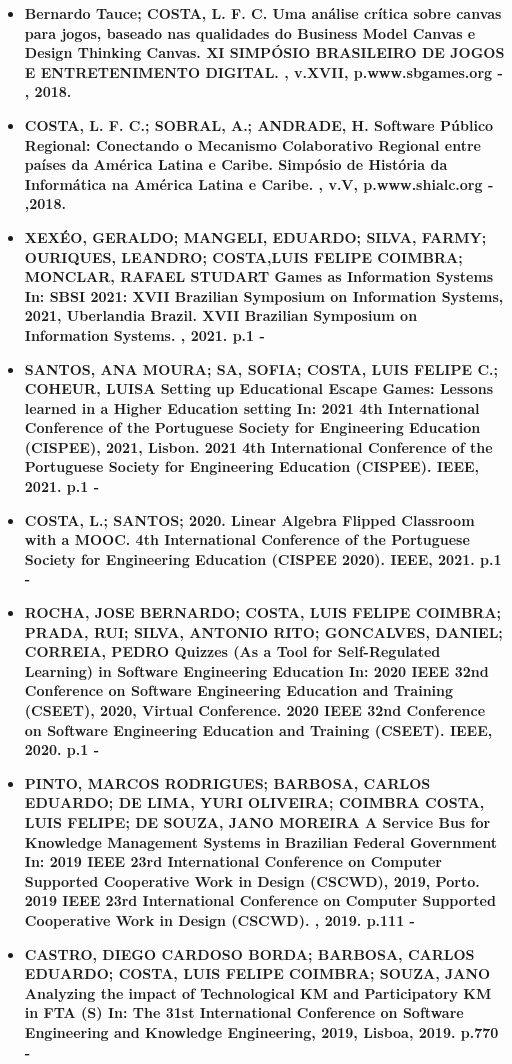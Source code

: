 \begin {itemize}
    \item\textbf {Bernardo Tauce; COSTA, L. F. C.
Uma análise crítica sobre canvas para jogos, baseado nas qualidades do Business Model Canvas e
Design Thinking Canvas. XI SIMPÓSIO BRASILEIRO DE JOGOS E ENTRETENIMENTO DIGITAL. , v.XVII, p.www.sbgames.org - , 2018.}
     \item\textbf {COSTA, L. F. C.; SOBRAL, A.; ANDRADE, H.
Software Público Regional: Conectando o Mecanismo Colaborativo Regional entre países da América
Latina e Caribe. Simpósio de História da Informática na América Latina e Caribe. , v.V, p.www.shialc.org - ,2018.}
     \item\textbf {XEXÉO, GERALDO; MANGELI, EDUARDO; SILVA, FARMY; OURIQUES, LEANDRO; COSTA,LUIS FELIPE COIMBRA; MONCLAR, RAFAEL STUDART
Games as Information Systems In: SBSI 2021: XVII Brazilian Symposium on Information Systems, 2021,
Uberlandia Brazil. XVII Brazilian Symposium on Information Systems. , 2021. p.1 -}
     \item\textbf {SANTOS, ANA MOURA; SA, SOFIA; COSTA, LUIS FELIPE C.; COHEUR, LUISA
Setting up Educational Escape Games: Lessons learned in a Higher Education setting In: 2021 4th
International Conference of the Portuguese Society for Engineering Education (CISPEE), 2021, Lisbon.
2021 4th International Conference of the Portuguese Society for Engineering Education (CISPEE).
IEEE, 2021. p.1 -}
     \item\textbf {COSTA, L.; SANTOS; 2020. Linear Algebra Flipped Classroom with a MOOC. 4th
International Conference of the Portuguese Society for Engineering Education (CISPEE 2020).
IEEE, 2021. p.1 -}
    \item\textbf {ROCHA, JOSE BERNARDO; COSTA, LUIS FELIPE COIMBRA; PRADA, RUI; SILVA, ANTONIO
RITO; GONCALVES, DANIEL; CORREIA, PEDRO
Quizzes (As a Tool for Self-Regulated Learning) in Software Engineering Education In: 2020 IEEE 32nd
Conference on Software Engineering Education and Training (CSEET), 2020, Virtual Conference.
2020 IEEE 32nd Conference on Software Engineering Education and Training (CSEET). IEEE,
2020. p.1 -}
    \item\textbf {PINTO, MARCOS RODRIGUES; BARBOSA, CARLOS EDUARDO; DE LIMA, YURI OLIVEIRA;
COIMBRA COSTA, LUIS FELIPE; DE SOUZA, JANO MOREIRA
A Service Bus for Knowledge Management Systems in Brazilian Federal Government In: 2019 IEEE 23rd
International Conference on Computer Supported Cooperative Work in Design (CSCWD), 2019, Porto.
2019 IEEE 23rd International Conference on Computer Supported Cooperative Work in Design
(CSCWD). , 2019. p.111 -}
    \item\textbf {CASTRO, DIEGO CARDOSO BORDA; BARBOSA, CARLOS EDUARDO; COSTA, LUIS FELIPE
COIMBRA; SOUZA, JANO
Analyzing the impact of Technological KM and Participatory KM in FTA (S) In: The 31st International Conference on Software Engineering and Knowledge Engineering, 2019, Lisboa, 2019. p.770 -}
\end {itemize}


